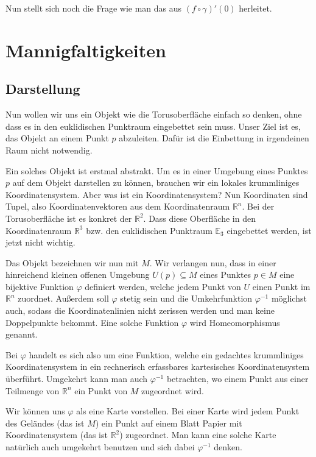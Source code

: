 \documentclass[a4paper,12pt,fleqn]{article}
\begin{document}
Nun stellt sich noch die Frage wie man das aus \((f\circ\gamma)'(0)\)
herleitet.

\section{Mannigfaltigkeiten}
\subsection{Darstellung}
Nun wollen wir uns ein Objekt wie die Torusoberfläche einfach so
denken, ohne dass es in den euklidischen Punktraum eingebettet
sein muss. Unser Ziel ist es, das Objekt an einem Punkt \(p\)
abzuleiten. Dafür ist die Einbettung in irgendeinen Raum nicht
notwendig.

Ein solches Objekt ist erstmal abstrakt. Um es in einer Umgebung
eines Punktes \(p\) auf dem Objekt darstellen zu können, brauchen
wir ein lokales krummliniges Koordinatensystem. Aber was ist ein
Koordinatensystem? Nun Koordinaten sind Tupel, also
Koordinatenvektoren aus dem Koordinatenraum \(\mathbb R^n\). Bei
der Torusoberfläche ist es konkret der \(\mathbb R^2\). Dass diese
Oberfläche in den Koordinatenraum \(\mathbb R^3\) bzw. den
euklidischen Punktraum \(\mathbb E_3\) eingebettet werden, ist jetzt
nicht wichtig.

Das Objekt bezeichnen wir nun mit \(M\). Wir verlangen nun, dass
in einer hinreichend kleinen offenen Umgebung \(U(p)\subseteq M\)
eines Punktes \(p\in M\) eine bijektive Funktion \(\varphi\)
definiert werden, welche jedem Punkt von \(U\) einen Punkt im
\(\mathbb R^n\) zuordnet. Außerdem soll \(\varphi\) stetig sein
und die Umkehrfunktion \(\varphi^{-1}\) möglichst auch, sodass die
Koordinatenlinien nicht zerissen werden und man keine Doppelpunkte
bekommt. Eine solche Funktion \(\varphi\) wird Homeomorphismus
genannt.

Bei \(\varphi\) handelt es sich also um eine Funktion, welche
ein gedachtes krummliniges Koordinatensystem in ein
rechnerisch erfassbares kartesisches Koordinatensystem
überführt. Umgekehrt kann man auch \(\varphi^{-1}\) betrachten,
wo einem Punkt aus einer Teilmenge von \(\mathbb R^n\) ein Punkt
von \(M\) zugeordnet wird.

Wir können uns \(\varphi\) als eine Karte vorstellen. Bei einer
Karte wird jedem Punkt des Geländes (das ist \(M\)) ein Punkt auf
einem Blatt Papier mit Koordinatensystem (das ist \(\mathbb R^2\))
zugeordnet. Man kann eine solche Karte natürlich auch umgekehrt
benutzen und sich dabei \(\varphi^{-1}\) denken.
\end{document}
